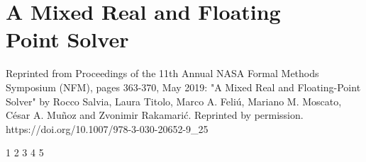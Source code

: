 
\chapter{A Mixed Real and Floating\\Point Solver}
\label{sec:fprock}
Reprinted from Proceedings of the 11th Annual NASA Formal Methods Symposium (NFM), pages 363-370, May 2019: "A Mixed Real and Floating-Point Solver" by Rocco Salvia, Laura Titolo, Marco A. Feli\'{u}, Mariano M. Moscato, C\'{e}sar A. Mu\~{n}oz and Zvonimir Rakamari\'c. Reprinted by permission.\\
https://doi.org/10.1007/978-3-030-20652-9\_25


\setupuuchapterbib

                              		{1}
		{2}
       				{3}
                      					{4}
                              			{5}






%
%